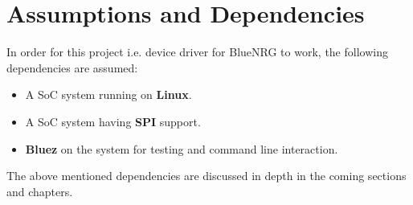 \section{Assumptions and Dependencies}
In order for this project i.e. device driver for BlueNRG to work, the following dependencies are assumed:
\begin{itemize}
	\item A SoC system running on \textbf{Linux}.
	\item A SoC system having \textbf{SPI} support.
	\item \textbf{Bluez} on the system for testing and command line interaction.
\end{itemize}
The above mentioned dependencies are discussed in depth in the coming sections and chapters.

